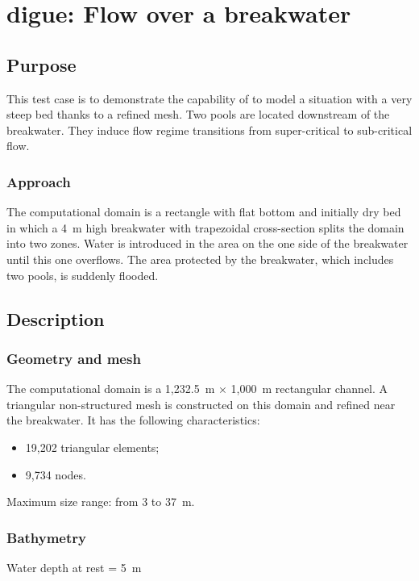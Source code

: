 \chapter{digue: Flow over a breakwater}

\section{Purpose}

This test case is to demonstrate the capability of 
to model a situation with a very steep bed thanks to a refined 
mesh.
Two pools are located downstream of the breakwater.
They induce flow regime transitions from super-critical to sub-critical flow.

\subsection{Approach}

The computational domain is a rectangle with flat bottom
and initially dry bed in which a 4~m high breakwater
with trapezoidal cross-section splits the domain into two zones.
Water is introduced in the area on the one side of the breakwater
until this one overflows.
The area protected by the breakwater, which includes 
two pools, is suddenly flooded.

\section{Description}

\subsection{Geometry and mesh}

The computational domain is a 1,232.5~m $\times$ 1,000~m rectangular channel.
A triangular non-structured mesh is constructed on this domain
and refined near the breakwater.
It has the following characteristics:
\begin{itemize}
\item 19,202 triangular elements;
\item 9,734 nodes.
\end{itemize}
Maximum size range: from 3 to 37~m.


\subsection{Bathymetry}

Water depth at rest = 5~m

